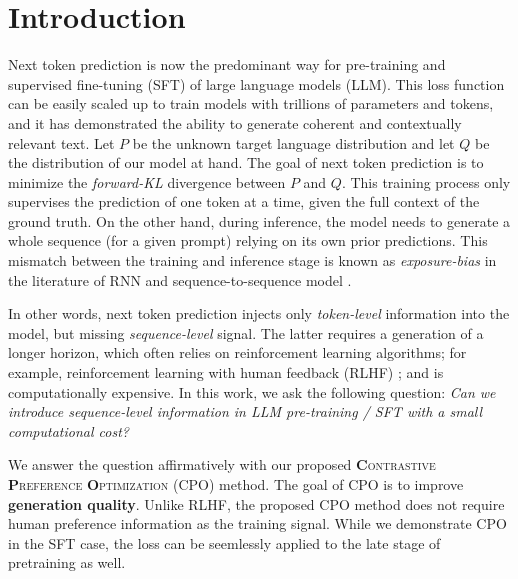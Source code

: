 \section{Introduction}


Next token prediction is now the predominant way for pre-training and supervised fine-tuning (SFT) of large language models (LLM). This loss function can be easily scaled up to train models with trillions of parameters and tokens, and it has demonstrated the ability to generate coherent and contextually relevant text. Let $P$ be the unknown target language distribution and let $Q$ be the distribution of our model at hand. The goal of next token prediction is to minimize the \textit{forward-KL} divergence between $P$ and $Q$. This training process only supervises the prediction of one token at a time, given the full context of the ground truth. On the other hand, during inference, the model needs to generate a whole sequence (for a given prompt) relying on its own prior predictions. This mismatch between the training and inference stage is known as \textit{exposure-bias} in the literature of RNN and sequence-to-sequence model \citep{bengio2015scheduled,ranzato2015sequence}.

In other words, next token prediction injects only \textit{token-level} information into the model, but missing \textit{sequence-level} signal. The latter requires a generation of a longer horizon, which often relies on reinforcement learning algorithms; for example, reinforcement learning with human feedback (RLHF) \citep{ouyang2022training}; and is computationally expensive.
In this work, we ask the following question:
	\textit{Can we introduce sequence-level information in LLM pre-training / SFT with a small computational cost?}

We answer the question affirmatively with our proposed \textsc{\textbf{C}ontrastive \textbf{P}reference \textbf{O}ptimization} (CPO) method. The goal of CPO is to improve \textbf{generation quality}. Unlike RLHF, the proposed CPO method does not require human preference information as the training signal. While we demonstrate CPO in the SFT case, the loss can be seemlessly applied to the late stage of pretraining as well.

